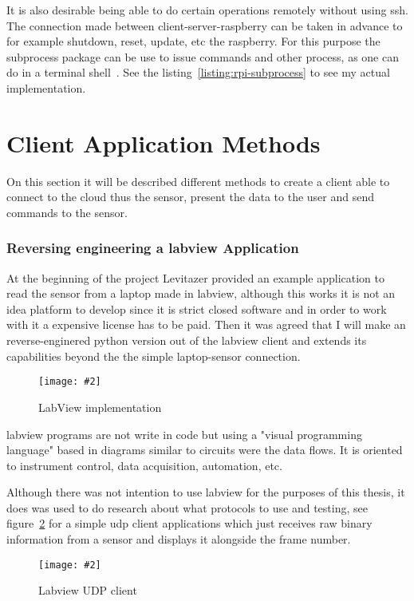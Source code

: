 \documentclass[hidelinks,11pt,a4paper,oneside,article]{memoir}
\newcommand{\putimage}[3][10] %
{
\begin{figure}[h]
	\centering
	\captionsetup{justification=centering}
	\texttt{[image: \#2]}
	\caption{#3}
	\label{fig:#2}
\end{figure}
}
\begin{document}
It is also desirable being able to do certain operations remotely without using \gls{ssh}. The connection made between client-server-raspberry can be taken in advance to for example shutdown, reset, update, etc the raspberry. For this purpose the subprocess package can be use to issue commands and other process, as one can do in a terminal shell~\cite{python-subprocess}. See the listing~\ref{listing:rpi-subprocess} to see my actual implementation.

\section{Client Application Methods}\label{sec:client-application-methods}
On this section it will be described different methods to create a client able to connect to the cloud thus the sensor, present the data to the user and send commands to the sensor.

\subsubsection{Reversing engineering a \gls{labview} Application}
At the beginning of the project Levitazer provided an example application to read the sensor from a laptop made in \gls{labview}, although this works it is not an idea platform to develop since it is strict closed software and in order to work with it a expensive license has to be paid. Then it was agreed that I will make an reverse-enginered python version out of the \gls{labview} client and extends its capabilities beyond the the simple laptop-sensor connection.

    \putimage{labview}{LabView implementation}
    
\gls{labview} programs are not write in code but using a "visual programming language" based in diagrams similar to circuits were the data flows. It is oriented to instrument control, data acquisition, automation, etc.~\cite{labview}

Although there was not intention to use \gls{labview} for the purposes of this thesis, it does was used to do research about what protocols to use and testing, see figure~\ref{fig:labview-udp} for a simple \gls{udp} client applications which just receives raw binary information from a sensor and displays it alongside the frame number.

    \putimage{labview-udp}{Labview UDP client}

\end{document}
